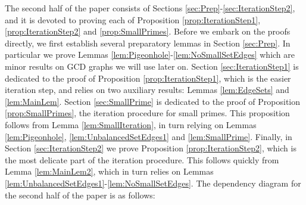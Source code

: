 \documentclass[12pt]{amsart}
\numberwithin{equation}{section}
\theoremstyle{definition}
\theoremstyle{remark}
\begin{document}
\begin{center}
{{\begin{center}
\end{center}}}
   \end{center}
%
%
%
%
%
%

\medskip

The second half of the paper consists of Sections \ref{sec:Prep}-\ref{sec:IterationStep2}, and it is devoted to proving each of Proposition \ref{prop:IterationStep1}, \ref{prop:IterationStep2} and \ref{prop:SmallPrimes}. Before we embark on the proofs directly, we first establish several preparatory lemmas in Section \ref{sec:Prep}. In particular we prove Lemmas \ref{lem:Pigeonhole}-\ref{lem:NoSmallSetEdges} which are minor results on GCD graphs we will use later on. Section \ref{sec:IterationStep1} is dedicated to the proof of Proposition \ref{prop:IterationStep1}, which is the easier iteration step, and relies on two auxiliary results: Lemmas  \ref{lem:EdgeSets} and \ref{lem:MainLem}. Section \ref{sec:SmallPrime} is dedicated to the proof of Proposition \ref{prop:SmallPrimes}, the iteration procedure for small primes. This proposition follows from Lemma \ref{lem:SmallIteration}, in turn relying on Lemmas \ref{lem:Pigeonhole}, \ref{lem:UnbalancedSetEdges1} and \ref{lem:SmallPrime}. Finally, in Section \ref{sec:IterationStep2} we prove Proposition \ref{prop:IterationStep2}, which is the most delicate part of the iteration procedure. This follows quickly from Lemma \ref{lem:MainLem2}, which in turn relies on Lemmas \ref{lem:UnbalancedSetEdges1}-\ref{lem:NoSmallSetEdges}. The dependency diagram for the second half of the paper is as follows:
\end{document}
